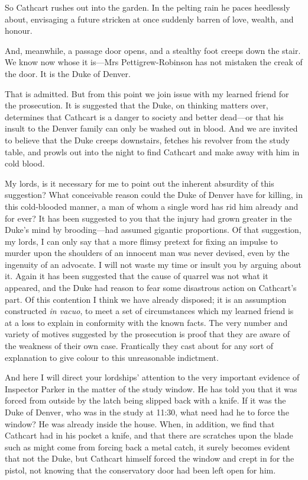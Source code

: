 \begin{dialogue}
\smallskip 

So Cathcart rushes out into the garden. In the pelting rain he paces heedlessly about, envisaging a future stricken at once suddenly barren of love, wealth, and honour.

\smallskip 

And, meanwhile, a passage door opens, and a stealthy foot creeps down the stair. We know now whose it is—Mrs Pettigrew-Robinson has not mistaken the creak of the door. It is the Duke of Denver.

\smallskip 

That is admitted. But from this point we join issue with my learned friend for the prosecution. It is suggested that the Duke, on thinking matters over, determines that Cathcart is a danger to society and better dead—or that his insult to the Denver family can only be washed out in blood. And we are invited to believe that the Duke creeps downstairs, fetches his revolver from the study table, and prowls out into the night to find Cathcart and make away with him in cold blood.

\smallskip 

My lords, is it necessary for me to point out the inherent absurdity of this suggestion? What conceivable reason could the Duke of Denver have for killing, in this cold-blooded manner, a man of whom a single word has rid him already and for ever? It has been suggested to you that the injury had grown greater in the Duke's mind by brooding—had assumed gigantic proportions. Of that suggestion, my lords, I can only say that a more flimsy pretext for fixing an impulse to murder upon the shoulders of an innocent man was never devised, even by the ingenuity of an advocate. I will not waste my time or insult you by arguing about it. Again it has been suggested that the cause of quarrel was not what it appeared, and the Duke had reason to fear some disastrous action on Cathcart's part. Of this contention I think we have already disposed; it is an assumption constructed \textit{in vacuo}, to meet a set of circumstances which my learned friend is at a loss to explain in conformity with the known facts. The very number and variety of motives suggested by the prosecution is proof that they are aware of the weakness of their own case. Frantically they cast about for any sort of explanation to give colour to this unreasonable indictment.

\smallskip 

And here I will direct your lordships' attention to the very important evidence of Inspector Parker in the matter of the study window. He has told you that it was forced from outside by the latch being slipped back with a knife. If it was the Duke of Denver, who was in the study at 11:30, what need had he to force the window? He was already inside the house. When, in addition, we find that Cathcart had in his pocket a knife, and that there are scratches upon the blade such as might come from forcing back a metal catch, it surely becomes evident that not the Duke, but Cathcart himself forced the window and crept in for the pistol, not knowing that the conservatory door had been left open for him.


\end{dialogue}
